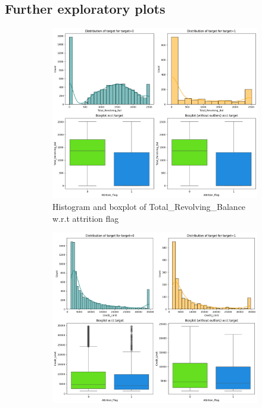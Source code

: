\documentclass[10pt,a4paper]{style}
\begin{document}
\subsection{Further exploratory plots}
	\begin{figure}[h]
		\centering
		\begin{subfigure}[t]{0.47\linewidth}
			\centering
			\includegraphics[width=\linewidth]{Total_Revolving_Bal vs Attrition_Flag.png}
			\caption{Histogram and boxplot of Total\_Revolving\_Balance w.r.t attrition flag}
			\label{fig:Total_Revolving_Bal vs Attrition_Flag}
		\end{subfigure}
		\hfill
		\begin{subfigure}[t]{0.47\linewidth}
			\centering
			\includegraphics[width=\linewidth]{Attrition_Flag vs Credit_Limit.png}

\end{subfigure}
\end{figure}
\end{document}
